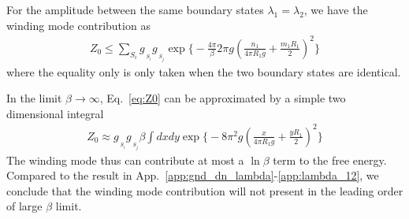 For the amplitude between the same boundary states $\lambda_1=\lambda_2$, we have the winding mode contribution as
\begin{equation}
\begin{aligned}
\label{eq:Z0}
Z_0 \le  \sum_{S_i} g_{\,\!_{S_i} }g_{\,\!_{S_j} } \exp\Big\{- \frac{4\pi}{\beta} 2 \pi g ( \frac{n_1}{ 4 \pi R_1 g} + \frac{m_1 R_1 }{ 2} )^2 \Big\}
\end{aligned}
\end{equation}
where the equality only is only taken when the two boundary states are identical. 

In the limit $\beta\rightarrow\infty$, Eq.~\eqref{eq:Z0} can be approximated by a simple two dimensional integral
\begin{equation}\begin{aligned}
Z_0\approx g_{\,\!_{S_i} }g_{\,\!_{S_j} }\beta\int dxdy\exp\Big\{-8 \pi^2 g ( \frac{x}{ 4 \pi R_1 g} + \frac{y R_1 }{ 2} )^2 \Big\}
\end{aligned}\end{equation}
The winding mode thus can contribute at most a $\ln\beta$ term to the free energy. Compared to the result in App.~\ref{app:gnd_dn_lambda}-\ref{app:lambda_12}, we conclude that the winding mode contribution will not present in the leading order of large $\beta$ limit. 


